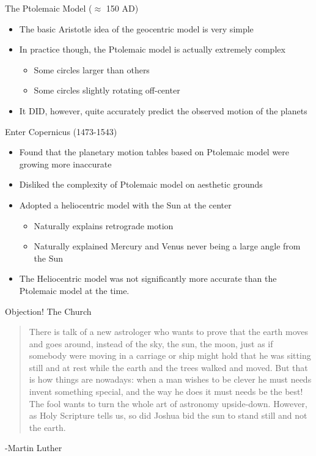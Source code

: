 \documentclass[pdf, aspectratio=169]{beamer}
\begin{document}
\begin{frame}{The Ptolemaic Model ($\approx$ 150 AD)}
  \begin{itemize}
	\item The basic Aristotle idea of the geocentric model is very simple
	\item In practice though, the Ptolemaic model is actually extremely complex
	  \begin{itemize}
		\item Some circles larger than others
		\item Some circles slightly rotating off-center
	  \end{itemize}
	\item It DID, however, quite accurately predict the observed motion of the planets
  \end{itemize}
\end{frame}

\begin{frame}{Enter Copernicus (1473-1543)}
  \begin{itemize}
	\item Found that the planetary motion tables based on Ptolemaic model were growing more inaccurate
	\item Disliked the complexity of Ptolemaic model on aesthetic grounds
	\item Adopted a \alert{heliocentric} model with the Sun at the center
	  \begin{itemize}
		\item Naturally explains retrograde motion
		\item Naturally explained Mercury and Venus never being a large angle from the Sun
	  \end{itemize}
	\item The Heliocentric model was \alert{not} significantly more accurate than the Ptolemaic model at the time.
  \end{itemize}
\end{frame}

\begin{frame}{Objection! The Church}
  \begin{quote}
	There is talk of a new astrologer who wants to prove that
the earth moves and goes around, instead of the sky,
the sun, the moon, just as if somebody were moving in a
carriage or ship might hold that he was sitting still and at
rest while the earth and the trees walked and moved.
But that is how things are nowadays: when a man
wishes to be clever he must needs invent something
special, and the way he does it must needs be the best!
The fool wants to turn the whole art of astronomy
upside-down. However, as Holy Scripture tells us, so did
Joshua bid the sun to stand still and not the earth. 
  \end{quote}
  \begin{flushright}
	-Martin Luther
  \end{flushright}
\end{frame}
\end{document}
